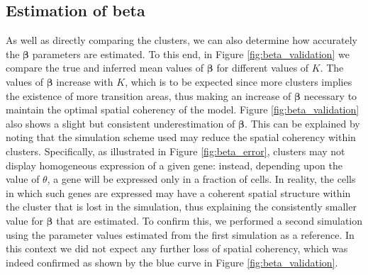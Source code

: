 	\subsection{Estimation of beta}
	As well as directly comparing the clusters, we can also determine how accurately the $\mathbf{\beta}$ parameters are estimated. To this end, in Figure \ref{fig:beta_validation} we compare the true and inferred mean values of $\mathbf{\beta}$ for different values of $K$. The values of $\mathbf{\beta}$ increase with $K$, which is to be expected since more clusters implies the existence of more transition areas, thus making an increase of $\mathbf{\beta}$ necessary to maintain the optimal spatial coherency of the model. Figure \ref{fig:beta_validation} also shows a slight but consistent underestimation of $\mathbf{\beta}$. This can be explained by noting that the simulation scheme used may reduce the spatial coherency within clusters. Specifically, as illustrated in Figure \ref{fig:beta_error}, clusters may not display homogeneous expression of a given gene: instead, depending upon the value of $\theta$, a gene will be expressed only in a fraction of cells. In reality, the cells in which such genes are expressed may have a coherent spatial structure within the cluster that is lost in the simulation, thus explaining the consistently smaller value for $\mathbf{\beta}$ that are estimated. To confirm this, we performed a second simulation using the parameter values estimated from the first simulation as a reference. In this context we did not expect any further loss of spatial coherency, which was indeed confirmed as shown by the blue curve in Figure \ref{fig:beta_validation}.\\
	

